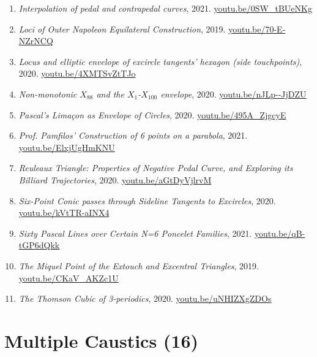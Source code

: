 \documentclass[12pt]{article}
\begin{document}
\begin{enumerate}[resume]
\item \textit{Interpolation of pedal and contrapedal curves}, 2021. \href{https://youtu.be/0SW_tBUeNKg}{\url{youtu.be/0SW\_tBUeNKg}}
\item \textit{Loci of Outer Napoleon Equilateral Construction}, 2019. \href{https://youtu.be/70-E-NZrNCQ}{\url{youtu.be/70-E-NZrNCQ}}
\item \textit{Locus and elliptic envelope of excircle tangents' hexagon (side touchpoints)}, 2020. \href{https://youtu.be/4XMTSvZtTJo}{\url{youtu.be/4XMTSvZtTJo}}
\item \textit{Non-monotonic $X_{88}$ and the $X_{1}$-$X_{100}$ envelope}, 2020. \href{https://youtu.be/nJLp--JjDZU}{\url{youtu.be/nJLp--JjDZU}}
\item \textit{Pascal's Limaçon as Envelope of Circles}, 2020. \href{https://youtu.be/495A_ZjgcyE}{\url{youtu.be/495A\_ZjgcyE}}
\item \textit{Prof. Pamfilos' Construction of 6 points on a parabola}, 2021. \href{https://youtu.be/ElxjUgHmKNU}{\url{youtu.be/ElxjUgHmKNU}}
\item \textit{Reuleaux Triangle: Properties of Negative Pedal Curve, and Exploring its Billiard Trajectories}, 2020. \href{https://youtu.be/aGtDyVjlrvM}{\url{youtu.be/aGtDyVjlrvM}}
\item \textit{Six-Point Conic passes through Sideline Tangents to Excircles}, 2020. \href{https://youtu.be/kVtTR-aINX4}{\url{youtu.be/kVtTR-aINX4}}
\item \textit{Sixty Pascal Lines over Certain N=6 Poncelet Families}, 2021. \href{https://youtu.be/qB-tGP6dQkk}{\url{youtu.be/qB-tGP6dQkk}}
\item \textit{The Miquel Point of the Extouch and Excentral Triangles}, 2019. \href{https://youtu.be/CKaV_AKZc1U}{\url{youtu.be/CKaV\_AKZc1U}}
\item \textit{The Thomson Cubic of 3-periodics}, 2020. \href{https://youtu.be/uNHIZXgZDOs}{\url{youtu.be/uNHIZXgZDOs}}
\end{enumerate}

\section{Multiple Caustics (16)}
\end{document}
